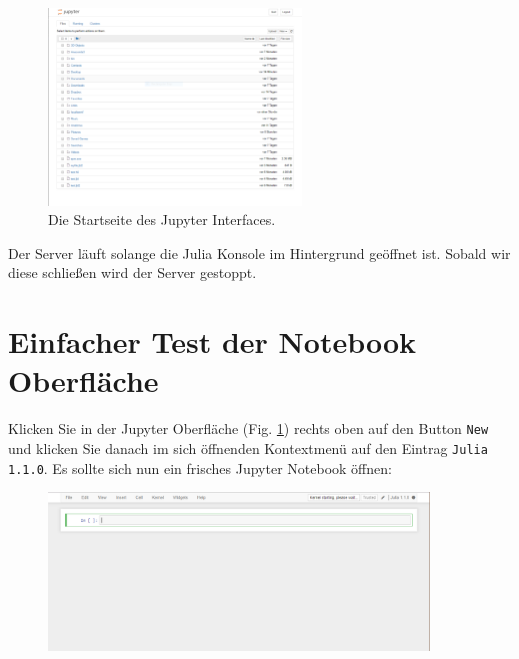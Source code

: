 \documentclass[11pt, a4paper]{scrartcl}
\begin{document}
	\begin{figure}[h!]
	\centering
	\includegraphics[width=0.6\textwidth]{imgs/jupyter.png}
	\caption{Die Startseite des Jupyter Interfaces. \label{fig:jupyter}}
	\end{figure}
	
	Der Server läuft solange die Julia Konsole im Hintergrund geöffnet ist. Sobald wir diese schließen wird der Server gestoppt.
	
	
	
	
	
	
	
	
	
	
	
	
	
	\newpage
	\section{Einfacher Test der Notebook Oberfläche}
	
	Klicken Sie in der Jupyter Oberfläche (Fig. \ref{fig:jupyter}) rechts oben auf den Button \texttt{New} und klicken Sie danach im sich öffnenden Kontextmenü auf den Eintrag \texttt{Julia 1.1.0}. Es sollte sich nun ein frisches Jupyter Notebook öffnen:
	
	\begin{figure}[h!]
	\centering
	\includegraphics[width=0.9\textwidth]{imgs/jupyter_notebook.png}
	\end{figure}
\end{document}
